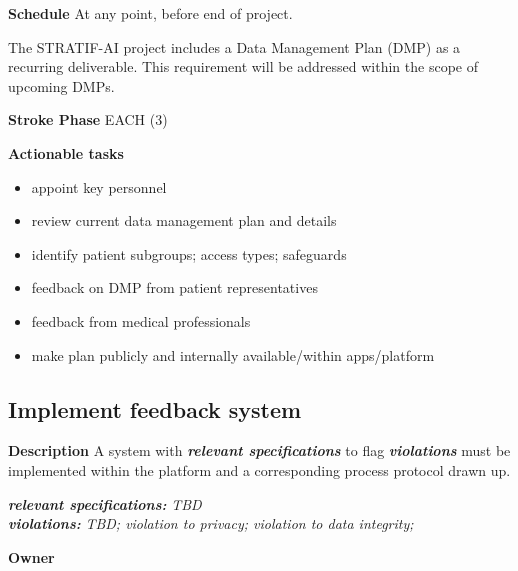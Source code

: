 \documentclass[
  letterpaper,
  DIV=11,
  numbers=noendperiod]{scrreport}
\providecommand{\tightlist}{%
  \setlength{\itemsep}{0pt}\setlength{\parskip}{0pt}}\usepackage{longtable,booktabs,array}
\begin{document}
\textbf{Schedule} At any point, before end of project.

\begin{tcolorbox}[enhanced jigsaw, arc=.35mm, breakable, coltitle=black, toptitle=1mm, colbacktitle=quarto-callout-note-color!10!white, toprule=.15mm, left=2mm, bottomrule=.15mm, opacitybacktitle=0.6, titlerule=0mm, colback=white, opacityback=0, title=\textcolor{quarto-callout-note-color}{\faInfo}\hspace{0.5em}{Note}, bottomtitle=1mm, colframe=quarto-callout-note-color-frame, leftrule=.75mm, rightrule=.15mm]

The STRATIF-AI project includes a Data Management Plan (DMP) as a
recurring deliverable. This requirement will be addressed within the
scope of upcoming DMPs.

\end{tcolorbox}

\textbf{Stroke Phase} EACH (3)

\textbf{Actionable tasks}

\begin{itemize}
\tightlist
\item
  appoint key personnel
\item
  review current data management plan and details
\item
  identify patient subgroups; access types; safeguards
\item
  feedback on DMP from patient representatives
\item
  feedback from medical professionals
\item
  make plan publicly and internally available/within apps/platform
\end{itemize}

\hypertarget{implement-feedback-system}{%
\subsection{Implement feedback system}\label{implement-feedback-system}}

\textbf{Description} A system with \textbf{\emph{relevant
specifications}} to flag \textbf{\emph{violations}} must be implemented
within the platform and a corresponding process protocol drawn up.

\textbf{\emph{relevant specifications:}} \emph{TBD}\\
\textbf{\emph{violations:}} \emph{TBD; violation to privacy; violation
to data integrity;}

\textbf{Owner}
\end{document}
